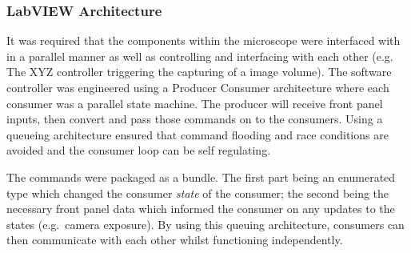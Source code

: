 \subsubsection{LabVIEW Architecture}


It was required that the components within the microscope were interfaced with in a parallel manner as well as controlling and interfacing with each other (e.g. The XYZ controller triggering the capturing of a image volume).
The software controller was engineered using a Producer Consumer architecture where each consumer was a parallel state machine.
The producer will receive front panel inputs, then convert and pass those commands on to the consumers.
Using a queueing architecture ensured that command flooding and race conditions are avoided and the consumer loop can be self regulating.

The commands were packaged as a bundle.
The first part being an enumerated type which changed the consumer \emph{state} of the consumer; the second being the necessary front panel data which informed the consumer on any updates to the states (e.g.\ camera exposure).
By using this queuing architecture, consumers can then communicate with each other whilst functioning independently.

%
%

